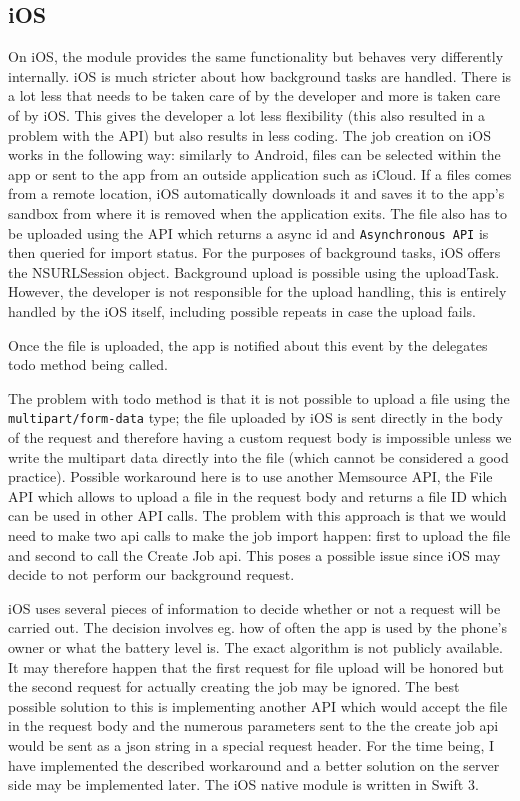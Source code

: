 \subsection{iOS}
On iOS, the module provides the same functionality but behaves very differently internally. iOS is much stricter about how background tasks are handled. There is a lot less that needs to be taken care of by the developer and more is taken care of by iOS. This gives the developer a lot less flexibility (this also resulted in a problem with the API) but also results in less coding. The job creation on iOS works in the following way: similarly to Android, files can be selected within the app or sent to the app from an outside application such as iCloud. If a files comes from a remote location, iOS automatically downloads it and saves it to the app’s sandbox from where it is removed when the application exits. The file also has to be uploaded using the API which returns a async id and \texttt{Asynchronous API} is then queried for import status. For the purposes of background tasks, iOS offers the NSURLSession object. Background upload is possible using the uploadTask. However, the developer is not responsible for the upload handling, this is entirely handled by the iOS itself, including possible repeats in case the upload fails. 


Once the file is uploaded, the app is notified about this event by the delegates todo method being called. 


The problem with todo method is that it is not possible to upload a file using the \texttt{multipart/form-data} type; the file uploaded by iOS is sent directly in the body of the request and therefore having a custom request body is impossible unless we write the multipart data directly into the file (which cannot be considered a good practice). Possible workaround here is to use another Memsource API, the File API which allows to upload a file in the request body and returns a file ID which can be used in other API calls. The problem with this approach is that we would need to make two api calls to make the job import happen: first to upload the file and second to call the Create Job api. This poses a possible issue since iOS may decide to not perform our background request. 

iOS uses several pieces of information to decide whether or not a request will be carried out. The decision involves eg. how of often the app is used by the phone's owner or what the battery level is. The exact algorithm is not publicly available. It may therefore happen that the first request for file upload will be honored but the second request for actually creating the job may be ignored. The best possible solution to this is implementing another API which would accept the file in the request body and the numerous parameters sent to the the create job api would be sent as a json string in a special request header. For the time being, I have implemented the described workaround and a better solution on the server side may be implemented later. The iOS native module is written in Swift 3.


